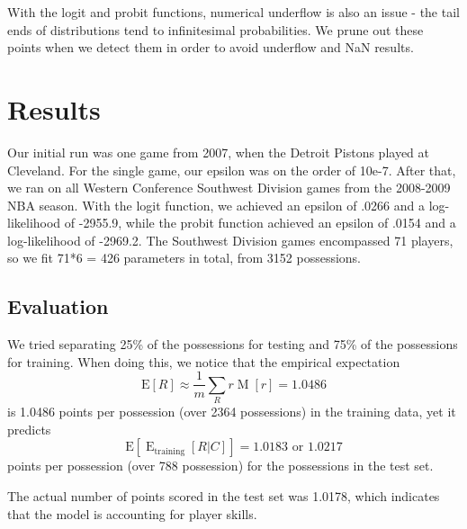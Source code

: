 \documentclass[10pt,twocolumn]{article}
\newcommand{\Elin}[1]{\ensuremath{     \mathrm{E}\left[ #1 \right]   }}
\begin{document}
With the logit and probit functions, numerical underflow is also an issue - the tail ends of distributions tend to infinitesimal probabilities. We prune out these points when we detect them in order to avoid underflow and NaN results.

\section{Results}

Our initial run was one game from 2007, when the Detroit Pistons played at Cleveland. For the single game, our epsilon was on the order of 10e-7. After that, we ran on all Western Conference Southwest Division games from the 2008-2009 NBA season. With the logit function, we achieved an epsilon of .0266 and a log-likelihood of -2955.9, while the probit function achieved an epsilon of .0154 and a log-likelihood of -2969.2. The Southwest Division games encompassed 71 players, so we fit 71*6 = 426 parameters in total, from 3152 possessions.

\subsection{Evaluation}
We tried separating 25\% of the possessions for testing and 75\% of the possessions for training. When doing this, we notice that the empirical expectation
\[
\Elin{R} \approx \frac{1}{m} \sum_{R} r \operatorname{M}\left[ r \right] = 1.0486
\]%
is 1.0486 points per possession (over 2364 possessions) in the training data, yet it predicts
\[
\Elin{\operatorname{E}_{\mathrm{training}}\left[R|C\right]} = 1.0183 \textrm{ or } 1.0217
\]%
points per possession (over 788 possession) for the possessions in the test set.

The actual number of points scored in the test set was 1.0178, which indicates that the model is accounting for player skills.
%
%
%
%
%
%
%
%
\end{document}
